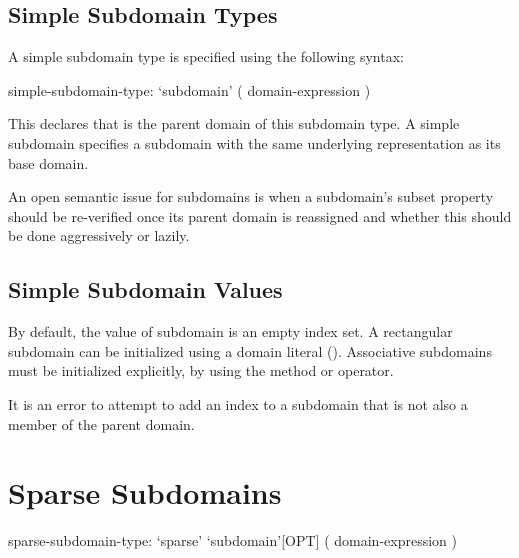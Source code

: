 \subsection{Simple Subdomain Types}
\label{Simple_Subdomain_Types}

A simple subdomain type is specified using the following syntax:
\begin{syntax}
simple-subdomain-type:
  `subdomain' ( domain-expression )
\end{syntax}

This declares that  is the parent domain of
this subdomain type.  A simple subdomain specifies a subdomain
with the same underlying representation as its base domain.  

\begin{openissue}

An open semantic issue for subdomains is when a subdomain's subset
property should be re-verified once its parent domain is reassigned
and whether this should be done aggressively or lazily.

\end{openissue}

\subsection{Simple Subdomain Values}

By default, the value of subdomain is an empty index set.  A rectangular subdomain
can be initialized using a domain literal ().
Associative subdomains must be initialized explicitly, by using the 
method or \chpl{+} operator.

It is an error to attempt to add an index to a subdomain that is not also
a member of the parent domain.

\section{Sparse Subdomains}
\label{Sparse_Subdomains}

\begin{syntax}
sparse-subdomain-type:
  `sparse' `subdomain'[OPT] ( domain-expression )
\end{syntax}

